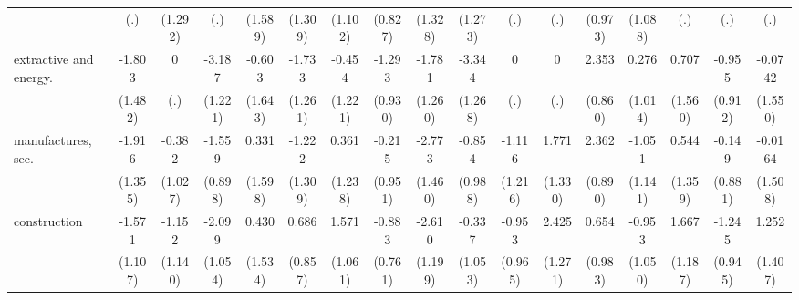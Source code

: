 {\begin{tabular}{l*{16}{c}}
                    &         (.)         &     (1.292)         &         (.)         &     (1.589)         &     (1.309)         &     (1.102)         &     (0.827)         &     (1.328)         &     (1.273)         &         (.)         &         (.)         &     (0.973)         &     (1.088)         &         (.)         &         (.)         &         (.)         \\
[1em]
extractive and energy.&      -1.803         &           0         &      -3.187\sym{**} &      -0.603         &      -1.733         &      -0.454         &      -1.293         &      -1.781         &      -3.344\sym{**} &           0         &           0         &       2.353\sym{**} &       0.276         &       0.707         &      -0.955         &     -0.0742         \\
                    &     (1.482)         &         (.)         &     (1.221)         &     (1.643)         &     (1.261)         &     (1.221)         &     (0.930)         &     (1.260)         &     (1.268)         &         (.)         &         (.)         &     (0.860)         &     (1.014)         &     (1.560)         &     (0.912)         &     (1.550)         \\
[1em]
manufactures, sec.  &      -1.916         &      -0.382         &      -1.559         &       0.331         &      -1.222         &       0.361         &      -0.215         &      -2.773         &      -0.854         &      -1.116         &       1.771         &       2.362\sym{**} &      -1.051         &       0.544         &      -0.149         &     -0.0164         \\
                    &     (1.355)         &     (1.027)         &     (0.898)         &     (1.598)         &     (1.309)         &     (1.238)         &     (0.951)         &     (1.460)         &     (0.988)         &     (1.216)         &     (1.330)         &     (0.890)         &     (1.141)         &     (1.359)         &     (0.881)         &     (1.508)         \\
[1em]
construction        &      -1.571         &      -1.152         &      -2.099\sym{*}  &       0.430         &       0.686         &       1.571         &      -0.883         &      -2.610\sym{*}  &      -0.337         &      -0.953         &       2.425         &       0.654         &      -0.953         &       1.667         &      -1.245         &       1.252         \\
                    &     (1.107)         &     (1.140)         &     (1.054)         &     (1.534)         &     (0.857)         &     (1.061)         &     (0.761)         &     (1.199)         &     (1.053)         &     (0.965)         &     (1.271)         &     (0.983)         &     (1.050)         &     (1.187)         &     (0.945)         &     (1.407)         \\

\end{tabular}}
